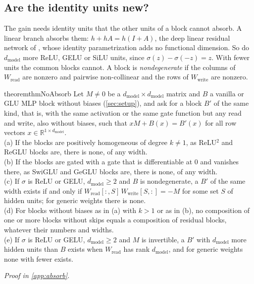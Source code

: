 \documentclass[10pt]{article}
\theoremstyle{definition}
\theoremstyle{remark}
\newcommand{\R}{\mathbb{R}}
\newcommand{\Wread}{W_{\mathrm{read}}}
\newcommand{\Wwrite}{W_{\mathrm{write}}}
\newcommand{\dm}{d_{\mathrm{model}}}
\newcommand{\proofin}[1]{\par\vspace{-0.4\baselineskip}\noindent\hfill{\small\itshape Proof in \cref{#1}.}\par\smallskip}
\begin{document}
\subsection{Are the identity units new?}\label{sec:oneblock}

The gain needs identity units that the other units of a block cannot absorb. A linear branch absorbs them: $h + hA = h(I + A)$, the deep linear residual network of \citet{hardt2017identity}, whose identity parametrization adds no functional dimension. So do $\dm$ more ReLU, GELU or SiLU units, since $\sigma(z) - \sigma(-z) = z$. With fewer units the common blocks cannot. A block is \emph{nondegenerate} if the columns of $\Wread$ are nonzero and pairwise non-collinear and the rows of $\Wwrite$ are nonzero.

\begin{restatable}{theorem}{thmNoAbsorb}\label{thm:noabsorb}
Let $M \neq 0$ be a $\dm \times \dm$ matrix and $B$ a vanilla or GLU MLP block without biases (\cref{sec:setup}), and ask for a block $B'$ of the same kind, that is, with the same activation or the same gate function but any read and write, also without biases, such that $xM + B(x) = B'(x)$ for all row vectors $x \in \R^{1\times\dm}$.\\
\textup{(a)} If the blocks are positively homogeneous of degree $k \neq 1$, as ReLU$^2$ and ReGLU blocks are, there is none, of any width.\\
\textup{(b)} If the blocks are gated with a gate that is differentiable at $0$ and vanishes there, as SwiGLU and GeGLU blocks are, there is none, of any width.\\
\textup{(c)} If $\sigma$ is ReLU or GELU, $\dm \ge 2$ and $B$ is nondegenerate, a $B'$ of the same width exists if and only if $\Wread[{:},S]\,\Wwrite[S,{:}] = -M$ for some set $S$ of hidden units; for generic weights there is none.\\
\textup{(d)} For blocks without biases as in (a) with $k > 1$ or as in (b), no composition of one or more blocks without skips equals a composition of residual blocks, whatever their numbers and widths.\\
\textup{(e)} If $\sigma$ is ReLU or GELU, $\dm \ge 2$ and $M$ is invertible, a $B'$ with $\dm$ more hidden units than $B$ exists when $\Wread$ has rank $\dm$, and for generic weights none with fewer exists.
\end{restatable}
\proofin{app:absorb}
\end{document}
